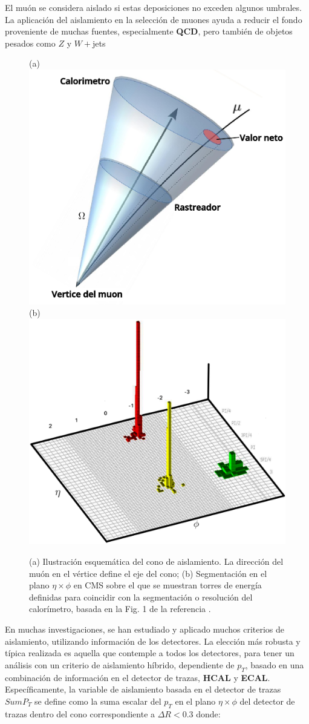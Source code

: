 El muón se considera aislado si estas deposiciones no exceden algunos umbrales. La aplicación del aislamiento en la selección de muones ayuda a reducir el fondo proveniente de muchas fuentes, especialmente \textbf{QCD}, pero también de objetos pesados como $Z$ y $W+$jets 
\begin{figure}[!t]
\centering
(a)
\includegraphics[width=.45\textwidth]{Cap2/imagenes/cono_mu.png}
(b)
\includegraphics[width=.45\textwidth]{Cap2/imagenes/plano.png}
\caption{(a) Ilustración esquemática del cono de aislamiento. La dirección del muón en el vértice define el eje del cono; (b) Segmentación en el plano $\eta \times\phi$ en CMS sobre el que se muestran torres de energía definidas para coincidir con la segmentación o resolución del calorímetro, basada en la Fig. 1 de la referencia \cite{tower_1}.}
\label{torre}
\end{figure}
En muchas investigaciones, se han estudiado y aplicado muchos criterios de aislamiento, utilizando información de los detectores. La elección más robusta y típica realizada es aquella que contemple a todos los detectores, para tener un análisis con un criterio de aislamiento híbrido, dependiente de $p_T$, basado en una combinación de información en el detector de trazas, \textbf{HCAL} y \textbf{ECAL}. Específicamente, la variable de aislamiento basada en el detector de trazas $SumP_T$ se define como la suma escalar del $p_T$ en el plano $\eta \times \phi$ del detector de trazas dentro del cono correspondiente a $\Delta R<0.3$ donde:
